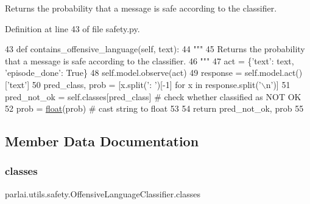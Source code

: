 \begin{DoxyVerb}Returns the probability that a message is safe according to the classifier.
\end{DoxyVerb}
 

Definition at line 43 of file safety.\+py.


\begin{DoxyCode}
43     \textcolor{keyword}{def }contains\_offensive\_language(self, text):
44         \textcolor{stringliteral}{"""}
45 \textcolor{stringliteral}{        Returns the probability that a message is safe according to the classifier.}
46 \textcolor{stringliteral}{        """}
47         act = \{\textcolor{stringliteral}{'text'}: text, \textcolor{stringliteral}{'episode\_done'}: \textcolor{keyword}{True}\}
48         self.model.observe(act)
49         response = self.model.act()[\textcolor{stringliteral}{'text'}]
50         pred\_class, prob = [x.split(\textcolor{stringliteral}{': '})[-1] \textcolor{keywordflow}{for} x \textcolor{keywordflow}{in} response.split(\textcolor{stringliteral}{'\(\backslash\)n'})]
51         pred\_not\_ok = self.classes[pred\_class]  \textcolor{comment}{# check whether classified as NOT OK}
52         prob = \hyperlink{namespaceprojects_1_1controllable__dialogue_1_1make__control__dataset_aa2b7207688c641dbc094ab44eca27113}{float}(prob)  \textcolor{comment}{# cast string to float}
53 
54         \textcolor{keywordflow}{return} pred\_not\_ok, prob
55 
\end{DoxyCode}


\subsection{Member Data Documentation}
\mbox{\label{classparlai_1_1utils_1_1safety_1_1OffensiveLanguageClassifier_a4230d2f45693c00e565fa90d7bae2d2a}} 
\subsubsection{\texorpdfstring{classes}{classes}}
{\footnotesize\ttfamily parlai.\+utils.\+safety.\+Offensive\+Language\+Classifier.\+classes}



